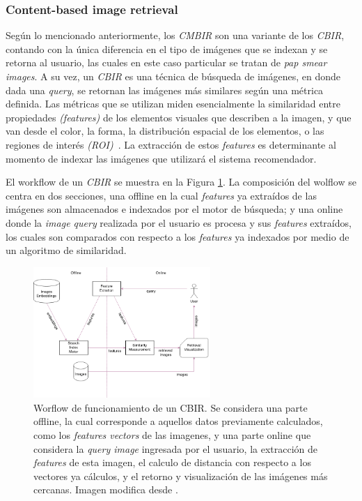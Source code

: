 \documentclass[10pt]{article}
\begin{document}
\subsubsection{Content-based image retrieval}
Según lo mencionado anteriormente, los \textit{CMBIR} son una variante de los \textit{CBIR}, contando con la única diferencia en el tipo de imágenes que se indexan y se retorna al usuario, las cuales en este caso particular se tratan de \textit{pap smear images}. A su vez, un \textit{CBIR} es una técnica de búsqueda de imágenes, en donde dada una \textit{query}, se retornan las imágenes más similares según una métrica definida. Las métricas que se utilizan miden esencialmente la similaridad entre propiedades \textit{(features)} de los elementos visuales que describen a la imagen, y que van desde el color, la forma, la distribución espacial de los elementos, o las regiones de interés \textit{(ROI)}~\cite{Datta2008}. La extracción de estos \textit{features} es determinante al momento de indexar las imágenes que utilizará el sistema recomendador.

El workflow de un \textit{CBIR} se muestra en la Figura \ref{fig:mt:1a}. La composición del wolflow se centra en dos secciones, una offline en la cual \textit{features} ya extraídos de las imágenes son almacenados e indexados por el motor de búsqueda; y una online donde la \textit{image query} realizada por el usuario es procesa  y sus \textit{features} extraídos, los cuales son comparados con respecto a los \textit{features} ya indexados por medio de un algoritmo de similaridad.

\begin{figure}
    \centering
    \includegraphics[width=0.6\textwidth]{img/cbir-flow.png}
    \caption{Worflow de funcionamiento de un CBIR. Se considera una parte offline, la cual corresponde a aquellos datos previamente calculados, como los \textit{features vectors} de las imagenes, y una parte online que considera la \textit{query image} ingresada por el usuario, la extracción de \textit{features} de esta imagen, el calculo de distancia con respecto a los vectores ya cálculos, y el retorno y visualización de las imágenes más cercanas. Imagen modifica desde \cite{Kumar2013}.}
    \label{fig:mt:1a}
\end{figure}
\end{document}

